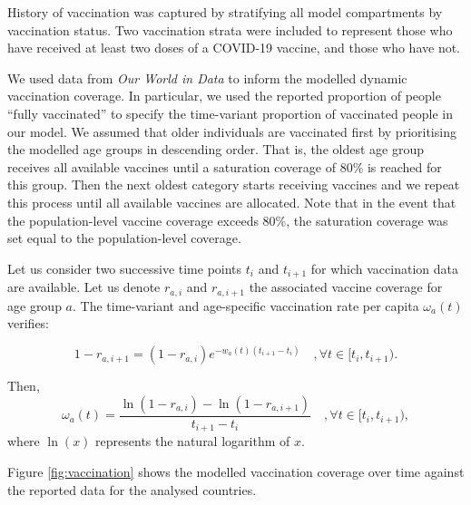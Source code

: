 
History of vaccination was captured by stratifying all model compartments by vaccination status.
Two vaccination strata were included to represent those who have received at least two doses of a COVID-19 vaccine,
and those who have not.

We used data from \textit{Our World in Data} to inform the modelled dynamic vaccination coverage. In particular, we used the reported proportion of 
people ``fully vaccinated'' to specify the time-variant proportion of vaccinated people in our model. We assumed that older individuals are vaccinated 
first by prioritising the modelled age groups in descending order. That is, the oldest age group receives all available vaccines until a 
saturation coverage of 80\% is reached for this group. Then the next oldest category starts receiving vaccines and we repeat this process until all available vaccines
are allocated. Note that in the event that the population-level vaccine coverage exceeds 80\%, the saturation coverage was set equal to the population-level coverage. 

Let us consider two successive time points $t_i$ and $t_{i+1}$ for which vaccination data are available. Let us denote $r_{a, i}$ and $r_{a, i+1}$ the associated vaccine 
coverage for age group $a$. The time-variant and age-specific vaccination rate per capita $\omega_a(t)$ verifies:

\begin{equation}
    1 - r_{a, i+1} = (1 - r_{a, i})e^{-w_a(t)(t_{i+1} - t_i)} \quad, \forall t \in [t_i, t_{i+1}) .
\end{equation}

Then, 
\begin{equation}
    \label{eq:vacc}
    \omega_a(t) = \frac{\ln(1 - r_{a, i}) - \ln(1 - r_{a, i+1})}{t_{i+1} - t_i} \quad, \forall t \in [t_i, t_{i+1}) ,
\end{equation}
where $\ln(x)$ represents the natural logarithm of $x$.

Figure \ref{fig:vaccination} shows the modelled vaccination coverage over time against the reported data for the analysed countries.

